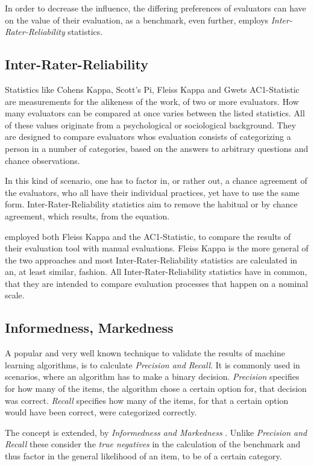 In order to decrease the influence, the differing preferences of evaluators can have on 
the value of their evaluation, as a benchmark, even further, \cite{28} employs 
\textit{Inter-Rater-Reliability} statistics.



\subsection{Inter-Rater-Reliability}

Statistics like Cohens Kappa\cite{29}, Scott's Pi\cite{30}, Fleiss Kappa\cite{31} and 
Gwets AC1-Statistic \cite{32} are measurements for the alikeness of the work, of two 
or more evaluators. How many evaluators can be compared at once varies between the
listed statistics. All of these values originate from a psychological or sociological
background. They are designed to compare evaluators whos evaluation consists of 
categorizing a person in a number of categories, based on the answers to arbitrary questions
and chance observations.

In this kind of scenario, one has to factor in, or rather out, a chance agreement of the
evaluators, who all have their individual practices, yet have to use the same form. 
Inter-Rater-Reliability statistics aim to remove the habitual or by chance agreement, which
results, from the equation. 

\cite{28} employed both Fleiss Kappa and the AC1-Statistic, to compare the results of their
evaluation tool with manual evaluations. Fleiss Kappa is the more general of the two 
approaches and most Inter-Rater-Reliability statistics are calculated in an, at least similar, 
fashion. All Inter-Rater-Reliability statistics have in common, that they are intended to
compare evaluation processes that happen on a nominal scale. 



\subsection{Informedness, Markedness}

A popular and very well known technique to validate the results of machine learning algorithms,
is to calculate \textit{Precision and Recall}. It is commonly used in scenarios, where an 
algorithm has to make a binary decision. 
\textit{Precision} specifies for how many of the items, the algorithm chose a certain option for,
that decision was correct. 
\textit{Recall} specifies how many of the items, for that a certain option would have been 
correct, were categorized correctly.

The concept is extended, by \textit{Informedness and Markedness} \cite{33}. Unlike 
\textit{Precision and Recall} these consider the \textit{true negatives} in the calculation
of the benchmark and thus factor in the general likelihood of an item, to be of a certain
category.